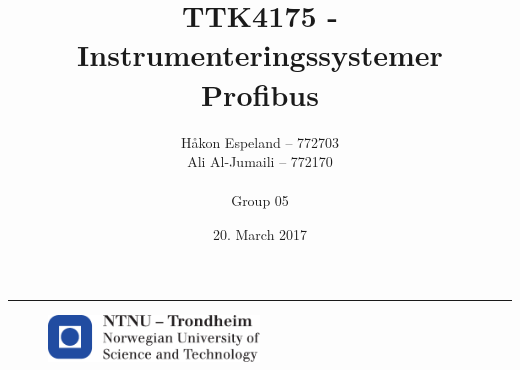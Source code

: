 \documentclass{article}
\title{TTK4175 - Instrumenteringssystemer\\\Large{\textbf{Profibus}}}
\author{Håkon Espeland -- 772703 \\ Ali Al-Jumaili -- 772170 \\\\ Group 05}
\date{20. March 2017}
\begin{document}
\begin{titlepage}
    \maketitle
    \rule{\linewidth}{0.5mm}
    \begin{figure}
    \centering
    \includegraphics[width=0.5\textwidth]{images/logontnu_eng}
    \end{figure}
    \thispagestyle{empty}
\end{titlepage}
\newpage\null\thispagestyle{empty}\newpage
\tableofcontents
\thispagestyle{empty} %
\newpage   

\newpage\null\thispagestyle{empty}\newpage

\setcounter{page}{1}






\end{document}
